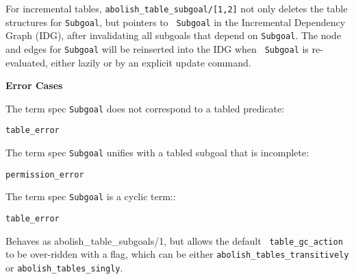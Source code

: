 \begin{description}
\begin{description}

%
For incremental tables, {\tt abolish\_table\_subgoal/[1,2]} not only
deletes the table structures for {\tt Subgoal}, but pointers to {\tt
  Subgoal} in the Incremental Dependency Graph (IDG), after
invalidating all subgoals that depend on {\tt Subgoal}. The node and
edges for {\tt Subgoal} will be reinserted into the IDG when {\tt
  Subgoal} is re-evaluated, either lazily or by an explicit update
command.


{\bf Error Cases}
\bi
\item The term spec {\tt Subgoal} does not correspond to a tabled predicate:
\bi
\item 	{\tt table\_error}
\ei
\item The term spec {\tt Subgoal} unifies with a tabled subgoal that is incomplete:
\bi
\item 	{\tt permission\_error}
\ei
\item The term spec {\tt Subgoal} is a cyclic term::
\bi
\item 	{\tt table\_error}
\ei
\ei
%

%
Behaves as {abolish\_table\_subgoals/1}, but allows the default {\tt
  table\_gc\_action} to be over-ridden with a flag, which can be either 
{\tt abolish\_tables\_transitively} or {\tt abolish\_tables\_singly}.


\end{description}
\end{description}
